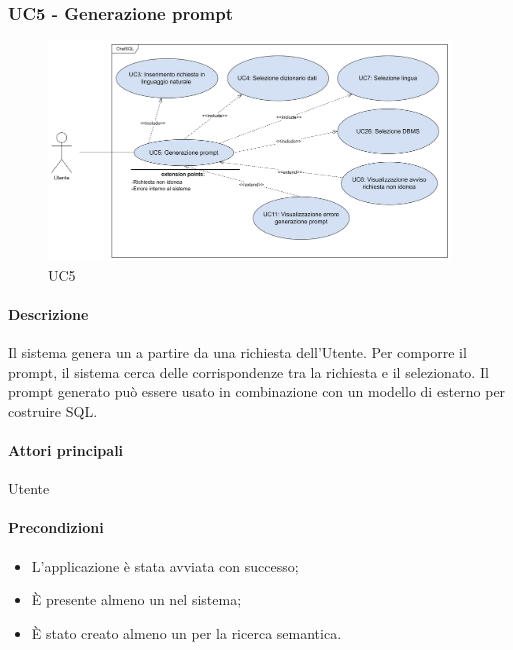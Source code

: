 \subsubsection{UC5 - Generazione prompt}\label{UC5}

\begin{figure}[H]
  \centering
  \includegraphics[width=0.95\textwidth]{assets/uc5.png}
  \caption{UC5}
\end{figure}

\paragraph*{Descrizione}
Il sistema genera un  a partire da una richiesta dell'Utente. Per comporre il prompt, il sistema cerca delle corrispondenze tra la richiesta e il  selezionato. Il prompt generato può essere usato in combinazione con un modello di  esterno per costruire  SQL.

\paragraph*{Attori principali}
Utente

\paragraph*{Precondizioni}
\begin{itemize}
  \item L'applicazione è stata avviata con successo;
  \item È presente almeno un  nel sistema;
  \item È stato creato almeno un  per la ricerca semantica.
\end{itemize}

